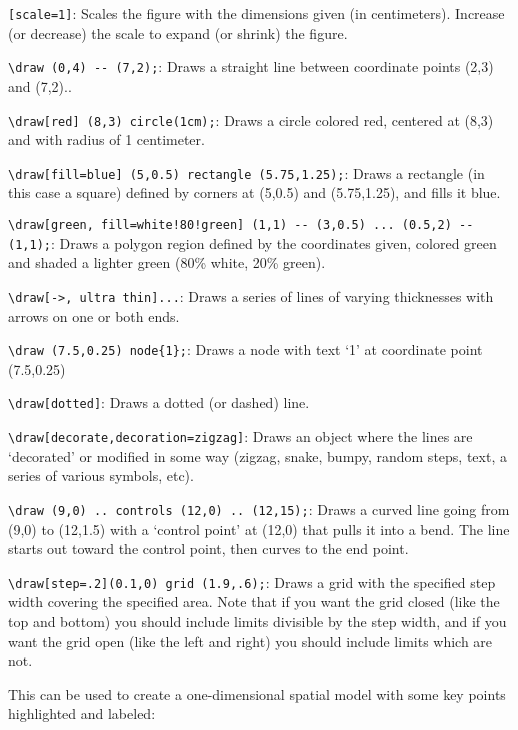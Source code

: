 \documentclass{article}
\begin{document}
\begin{compactitem}
\item \verb+[scale=1]+: Scales the figure with the dimensions given (in centimeters).  Increase (or decrease) the scale to expand (or shrink) the figure.
\item \verb+\draw (0,4) -- (7,2);+: Draws a straight line between coordinate points (2,3) and (7,2)..
\item \verb+\draw[red] (8,3) circle(1cm);+: Draws a circle colored red, centered at (8,3) and with radius of 1 centimeter.
\item \verb+\draw[fill=blue] (5,0.5) rectangle (5.75,1.25);+: Draws a rectangle (in this case a square) defined by corners at (5,0.5) and (5.75,1.25), and fills it blue.
\item \verb+\draw[green, fill=white!80!green] (1,1) -- (3,0.5) ... (0.5,2) -- (1,1);+: Draws a polygon region defined by the coordinates given, colored green and shaded a lighter green (80\% white, 20\% green).
\item \verb+\draw[->, ultra thin]...+: Draws a series of lines of varying thicknesses with arrows on one or both ends.
\item \verb+\draw (7.5,0.25) node{1};+: Draws a node with text `1' at coordinate point (7.5,0.25)
\item \verb+\draw[dotted]+: Draws a dotted (or dashed) line.
\item \verb+\draw[decorate,decoration=zigzag]+: Draws an object where the lines are `decorated' or modified in some way (zigzag, snake, bumpy, random steps, text, a series of various symbols, etc).
\item \verb+\draw (9,0) .. controls (12,0) .. (12,15);+: Draws a curved line going from (9,0) to (12,1.5) with a `control point' at (12,0) that pulls it into a bend.  The line starts out toward the control point, then curves to the end point.
\item \verb+\draw[step=.2](0.1,0) grid (1.9,.6);+: Draws a grid with the specified step width covering the specified area.  Note that if you want the grid closed (like the top and bottom) you should include limits divisible by the step width, and if you want the grid open (like the left and right) you should include limits which are not.\\
\end{compactitem}

\clearpage

This can be used to create a one-dimensional spatial model with some key points highlighted and labeled:\\
\end{document}
